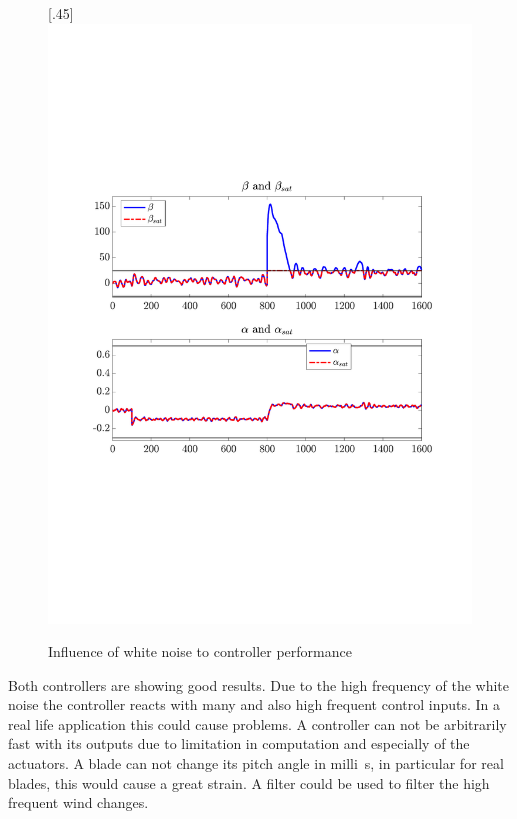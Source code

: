 \begin{figure}[H]
[.45\textwidth]{\includegraphics[width=1\linewidth, scale=1, trim=60 230 55 150,clip]{fig/Open_loop/exp_6_in.pdf}}

    \caption{Influence of white noise to controller performance}
    \label{fig:condes:results:intro_noise}
\end{figure}

Both controllers are showing good results.
Due to the high frequency of the white noise the controller reacts with many and also high frequent control inputs.
In a real life application this could cause problems.
A controller can not be arbitrarily fast with its outputs due to limitation in computation and especially of the actuators.
A blade can not change its pitch angle in \si{milli\second}, in particular for real blades, this would cause a great strain.
A filter could be used to filter the high frequent wind changes.